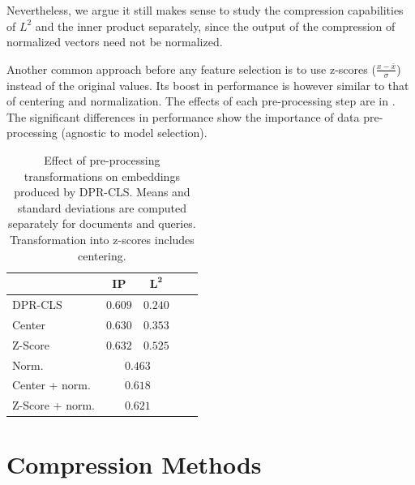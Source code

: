 Nevertheless, we argue it still makes sense to study the compression capabilities of $L^2$ and the inner product separately, since the output of the compression of normalized vectors need not be normalized.

Another common approach before any feature selection is to use z-scores ($\frac{x-\bar{x}}{\sigma}$) instead of the original values.
Its boost in performance is however similar to that of centering and normalization.
The effects of each pre-processing step are in .
The significant differences in performance show the importance of data pre-processing (agnostic to model selection).

\begin{table}[ht]
\center
\begin{tabular}{lcccc}
    \toprule
     & \textbf{IP} & $\mathbf{L^2}$ \\
    \midrule
    DPR-CLS & $0.609$ & $0.240$ \\
    \cmidrule{1-3}
    Center & $0.630$ & $0.353$ \\
    Z-Score & $0.632$ & $0.525$ \\
    Norm. & \multicolumn{2}{c}{$0.463$} \\
    Center + norm. & \multicolumn{2}{c}{$0.618$} \\
    Z-Score + norm. & \multicolumn{2}{c}{$0.621$} \\
    \bottomrule
\end{tabular}
\caption{Effect of pre-processing transformations on embeddings produced by DPR-CLS. Means and standard deviations are computed separately for documents and queries. Transformation into z-scores includes centering.}
\label{tab:zscore}
\end{table}

\section{Compression Methods} \label{sec:model_comparison}

